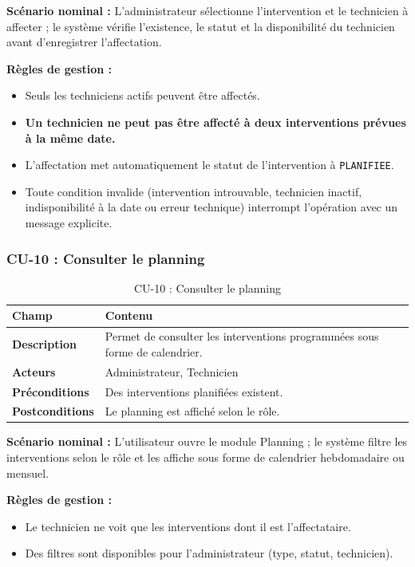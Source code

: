 \textbf{Scénario nominal :} L'administrateur sélectionne l'intervention et le technicien à affecter ; le système vérifie l'existence, le statut et la disponibilité du technicien avant d'enregistrer l'affectation.

\textbf{Règles de gestion :}
\begin{itemize}
    \item Seuls les techniciens actifs peuvent être affectés.
    \item \textbf{Un technicien ne peut pas être affecté à deux interventions prévues à la même date.}
    \item L'affectation met automatiquement le statut de l'intervention à \texttt{PLANIFIEE}.
    \item Toute condition invalide (intervention introuvable, technicien inactif, indisponibilité à la date ou erreur technique) interrompt l'opération avec un message explicite.
\end{itemize}

\subsubsection{CU-10 : Consulter le planning}

\begin{table}[H]
\centering
\caption{CU-10 : Consulter le planning}
\label{tab:ch4:cu10}
\begin{tabular}{|p{3.5cm}|p{11cm}|}
\hline
\textbf{Champ} & \textbf{Contenu} \\
\hline
\textbf{Description}
  & Permet de consulter les interventions programmées sous forme de calendrier. \\
\hline
\textbf{Acteurs}
  & Administrateur, Technicien \\
\hline
\textbf{Préconditions}
  & Des interventions planifiées existent. \\
\hline
\textbf{Postconditions}
  & Le planning est affiché selon le rôle. \\
\hline
\end{tabular}
\end{table}

\textbf{Scénario nominal :} L'utilisateur ouvre le module Planning ; le système filtre les interventions selon le rôle et les affiche sous forme de calendrier hebdomadaire ou mensuel.

\textbf{Règles de gestion :}
\begin{itemize}
    \item Le technicien ne voit que les interventions dont il est l'affectataire.
    \item Des filtres sont disponibles pour l'administrateur (type, statut, technicien).
\end{itemize}

